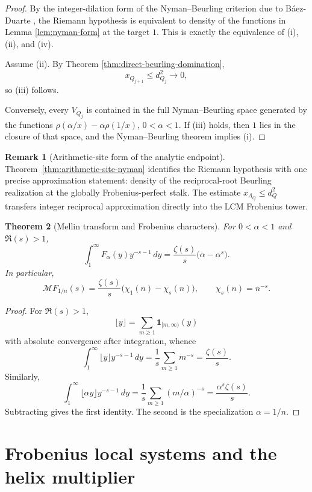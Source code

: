 \documentclass[11pt]{amsart}
\numberwithin{equation}{section}
\newtheorem{theorem}{Theorem}[section]
\theoremstyle{definition}
\newtheorem{remark}[theorem]{Remark}
\begin{document}
\begin{proof}
By the integer-dilation form of the Nyman--Beurling criterion due to
B\'aez-Duarte \cite{Nyman,Beurling,BaezDuarte}, the Riemann hypothesis is
equivalent to density of the functions in Lemma \ref{lem:nyman-form} at
the target $1$.  This is exactly the equivalence of (i), (ii), and (iv).

Assume (ii).  By Theorem \ref{thm:direct-beurling-domination},
\[
x_{Q_{j+1}}\leq d_{Q_j}^2\longrightarrow0,
\]
so (iii) follows.

Conversely, every $V_{Q_j}$ is contained in the full Nyman--Beurling
space generated by the functions
$\rho(\alpha/x)-\alpha\rho(1/x)$, $0<\alpha<1$.  If (iii) holds, then $1$
lies in the closure of that space, and the Nyman--Beurling theorem implies
(i).
\end{proof}

\begin{remark}[Arithmetic-site form of the analytic endpoint]
Theorem~\ref{thm:arithmetic-site-nyman} identifies the Riemann hypothesis
with one precise approximation statement: density of the reciprocal-root
Beurling realization at the globally Frobenius-perfect stalk.  The estimate
$x_{\Lambda_Q}\leq d_Q^2$ transfers integer reciprocal approximation
directly into the LCM Frobenius tower.
\end{remark}

\begin{theorem}[Mellin transform and Frobenius characters]
\label{thm:mellin-frobenius-characters}
For $0<\alpha<1$ and $\Re(s)>1$,
\[
\int_1^\infty F_\alpha(y)y^{-s-1}\,dy
=
\frac{\zeta(s)}s\bigl(\alpha-\alpha^s\bigr).
\]
In particular,
\[
\mathcal MF_{1/n}(s)
=
\frac{\zeta(s)}s
\bigl(\chi_1(n)-\chi_s(n)\bigr),
\qquad
\chi_s(n)=n^{-s}.
\]
\end{theorem}

\begin{proof}
For $\Re(s)>1$,
\[
\lfloor y\rfloor=\sum_{m\geq1}\mathbf1_{[m,\infty)}(y)
\]
with absolute convergence after integration, whence
\[
\int_1^\infty\lfloor y\rfloor y^{-s-1}\,dy
=\frac1s\sum_{m\geq1}m^{-s}
=\frac{\zeta(s)}s.
\]
Similarly,
\[
\int_1^\infty\lfloor\alpha y\rfloor y^{-s-1}\,dy
=\frac1s\sum_{m\geq1}(m/\alpha)^{-s}
=\frac{\alpha^s\zeta(s)}s.
\]
Subtracting gives the first identity.  The second is the specialization
$\alpha=1/n$.
\end{proof}

\section{Frobenius local systems and the helix multiplier}
\label{sec:helix-local-system}
\end{document}
